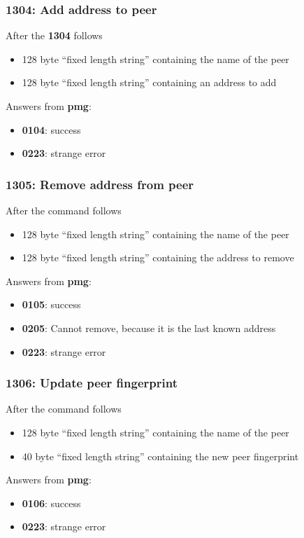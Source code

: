 \documentclass[12pt,a4paper]{book}
\begin{document}
\subsubsection{1304: Add address to peer}
After the \textbf{1304} follows
\begin{itemize}
\item 128 byte "`fixed length string"' containing the name of the peer
\item 128 byte "`fixed length string"' containing an address to add
\end{itemize}
Answers from \textbf{pmg}:
\begin{itemize}
\item \textbf{0104}: success
\item \textbf{0223}: strange error
\end{itemize}
\subsubsection{1305: Remove address from peer}
After the command follows
\begin{itemize}
\item 128 byte "`fixed length string"' containing the name of the peer
\item 128 byte "`fixed length string"' containing the address to remove
\end{itemize}
Answers from \textbf{pmg}:
\begin{itemize}
\item \textbf{0105}: success
\item \textbf{0205}: Cannot remove, because it is the last known address
\item \textbf{0223}: strange error
\end{itemize}
\subsubsection{1306: Update peer fingerprint}
After the command follows
\begin{itemize}
\item 128 byte "`fixed length string"' containing the name of the peer
\item 40  byte "`fixed length string"' containing the new peer fingerprint
\end{itemize}
Answers from \textbf{pmg}:
\begin{itemize}
\item \textbf{0106}: success
\item \textbf{0223}: strange error
\end{itemize}
\end{document}
